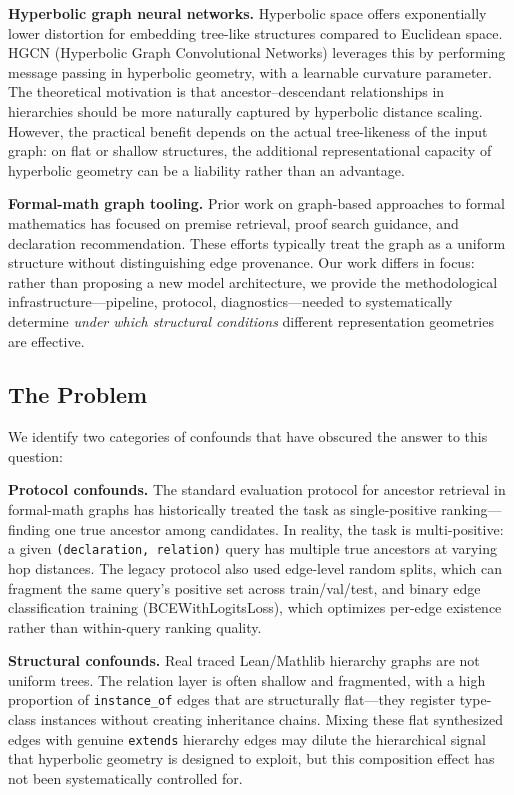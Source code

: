 \documentclass[runningheads]{llncs}
\begin{document}
\textbf{Hyperbolic graph neural networks.}
Hyperbolic space offers exponentially lower distortion for embedding tree-like structures compared to Euclidean space. HGCN (Hyperbolic Graph Convolutional Networks) leverages this by performing message passing in hyperbolic geometry, with a learnable curvature parameter. The theoretical motivation is that ancestor--descendant relationships in hierarchies should be more naturally captured by hyperbolic distance scaling. However, the practical benefit depends on the actual tree-likeness of the input graph: on flat or shallow structures, the additional representational capacity of hyperbolic geometry can be a liability rather than an advantage.

\textbf{Formal-math graph tooling.}
Prior work on graph-based approaches to formal mathematics has focused on premise retrieval, proof search guidance, and declaration recommendation. These efforts typically treat the graph as a uniform structure without distinguishing edge provenance. Our work differs in focus: rather than proposing a new model architecture, we provide the methodological infrastructure---pipeline, protocol, diagnostics---needed to systematically determine \emph{under which structural conditions} different representation geometries are effective.

\subsection{The Problem}

We identify two categories of confounds that have obscured the answer to this question:

\textbf{Protocol confounds.}
The standard evaluation protocol for ancestor retrieval in formal-math graphs has historically treated the task as single-positive ranking---finding one true ancestor among candidates. In reality, the task is multi-positive: a given \texttt{(declaration, relation)} query has multiple true ancestors at varying hop distances. The legacy protocol also used edge-level random splits, which can fragment the same query's positive set across train/val/test, and binary edge classification training (BCEWithLogitsLoss), which optimizes per-edge existence rather than within-query ranking quality.

\textbf{Structural confounds.}
Real traced Lean/Mathlib hierarchy graphs are not uniform trees. The relation layer is often shallow and fragmented, with a high proportion of \texttt{instance\_of} edges that are structurally flat---they register type-class instances without creating inheritance chains. Mixing these flat synthesized edges with genuine \texttt{extends} hierarchy edges may dilute the hierarchical signal that hyperbolic geometry is designed to exploit, but this composition effect has not been systematically controlled for.
\end{document}
